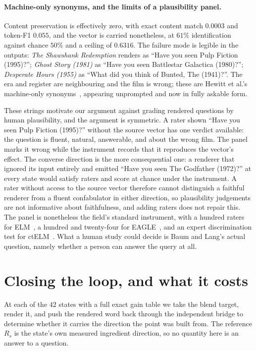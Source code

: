\documentclass[11pt]{article}
\begin{document}
\paragraph{Machine-only synonyms, and the limits of a plausibility panel.} Content preservation is
effectively zero, with exact content match $0.0003$ and token-F1 $0.055$, and the vector is carried
nonetheless, at $61\%$ identification against chance $50\%$ and a ceiling of $0.6316$. The failure
mode is legible in the outputs: \emph{The Shawshank Redemption} renders as ``Have you seen Pulp
Fiction (1995)?''; \emph{Ghost Story (1981)} as ``Have you seen Battlestar Galactica (1980)?'';
\emph{Desperate Hours (1955)} as ``What did you think of Bunted, The (1941)?''. The era and register
are neighbouring and the film is wrong; these are Hewitt et al.'s machine-only
synonyms~\cite{hewitt2025neologism}, appearing unprompted and now in fully askable form.

These strings motivate our argument against grading rendered questions by human plausibility, and the
argument is symmetric. A rater shown ``Have you seen Pulp Fiction (1995)?'' without the source vector
has one verdict available: the question is fluent, natural, answerable, and about the wrong film. The
panel marks it wrong while the instrument records that it reproduces the vector's effect. The converse
direction is the more consequential one: a renderer that ignored its input entirely and emitted ``Have
you seen The Godfather (1972)?'' at every state would satisfy raters and score at chance under the
instrument. A rater without access to the source vector therefore cannot distinguish a faithful
renderer from a fluent confabulator in either direction, so plausibility judgements are not
informative about faithfulness, and adding raters does not repair this. The panel is nonetheless the
field's standard instrument, with a hundred raters for ELM~\cite{tennenholtz2023elm}, a hundred and
twenty-four for EAGLE~\cite{tennenholtz2024eagle}, and an expert discrimination test for
ctELM~\cite{ondov2026ctelm}. What a human study could decide is Baum and Lang's actual question,
namely whether a person can answer the query at all.

\section{Closing the loop, and what it costs}
\label{sec:loop}

At each of the $42$ states with a full exact gain table we take the blend target, render it, and push
the rendered word back through the independent bridge to determine whether it carries the direction
the point was built from. The reference $R_s$ is the state's own measured ingredient direction, so no
quantity here is an answer to a question.
\end{document}
